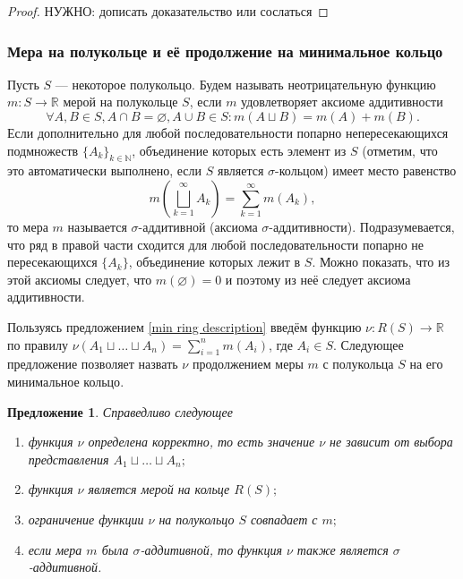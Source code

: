 \documentclass[12pt]{article}
\newtheorem{proposition}[theorem]{Предложение}
\numberwithin{theorem}{section}
\theoremstyle{definition}
\newcommand{\RR}{\mathbb{R}}
\newcommand{\defin}[2]{\hypertarget{#2}{{\color{red} #1}}}
\newcommand{\TODO}[1]{\textcolor{todocolor}{НУЖНО: #1}}
\begin{document}
	\begin{proof}
		\TODO{дописать доказательство или сослаться}
	\end{proof}
	
	\subsubsection{Мера на полукольце и её продолжение на минимальное кольцо}
	
	Пусть $ S $ --- некоторое полукольцо.
	Будем называть неотрицательную функцию $ m \colon S \to \RR $ \defin{мерой}{measure} на полукольце $ S $, 
	если $ m $ удовлетворяет аксиоме аддитивности
	$$ \forall A, B \in S, A \cap B = \varnothing, A \cup B \in S: m(A \sqcup B) = m(A) + m(B). $$
	Если дополнительно для любой последовательности попарно непересекающихся подмножеств $ \{A_k\}_{k \in \mathbb{N}} $,
	объединение которых есть элемент из $ S $ (отметим, что это автоматически выполнено, если $ S $ является $ \sigma $-кольцом)
	имеет место равенство
	$$ m\left(\bigsqcup\limits_{k = 1}^{\infty} A_k \right) = \sum\limits_{k = 1}^{\infty} m(A_k), $$
	то мера $ m $ называется \defin{$ \sigma $-аддитивной}{sigma-measure} (аксиома $ \sigma $-аддитивности).
	Подразумевается, что ряд в правой части сходится для любой последовательности попарно не пересекающихся $ \{A_k\} $, объединение которых лежит в $ S $.
	Можно показать, что из этой аксиомы следует, что $ m(\varnothing) = 0 $ и поэтому из неё следует аксиома аддитивности.
	
	Пользуясь предложением \ref{min ring description} введём функцию $ \nu \colon R(S) \to \RR $
	по правилу $ \nu(A_1 \sqcup \ldots \sqcup A_n) = \sum\limits_{i = 1}^{n} m(A_i) $, где $ A_i \in S $.
	Следующее предложение позволяет назвать $ \nu $ \defin{продолжением меры $ m $ с полукольца $ S $ на его минимальное кольцо}
	{extension-to-min-ring}.
	
	\begin{proposition}
		Справедливо следующее
		\begin{enumerate}
			\item функция $ \nu $ определена корректно, то есть значение $ \nu $ не зависит от выбора представления
			$ A_1 \sqcup \ldots \sqcup A_n; $
			\item функция $ \nu $ является мерой на кольце $ R(S); $
			\item ограничение функции $ \nu $ на полукольцо $ S $ совпадает с $ m; $
			\item если мера $ m $ была $ \sigma $-аддитивной, то функция $ \nu $ также является $ \sigma $-аддитивной.
		\end{enumerate}
	\end{proposition}
	
\end{document}
